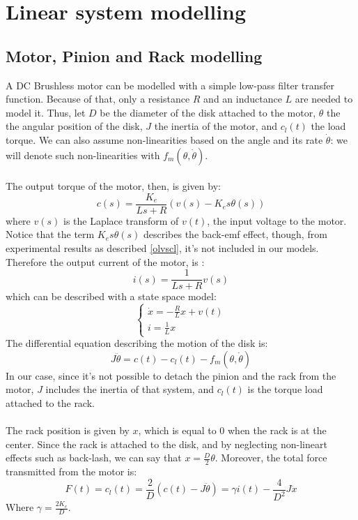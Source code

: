 
\chapter{Linear system modelling}
\section{Motor, Pinion and Rack modelling} 
A DC Brushless motor can be modelled with a simple low-pass filter transfer function. Because of that, only a resistance $R$ and an inductance $L$ are needed to model it. Thus, let $D$ be the diameter of the disk attached to the motor, $\theta$ the the angular position of the disk, $J$ the inertia of the motor, and $c_{l}(t)$ the load torque. We can also assume non-linearities based on the angle and its rate $\dot{\theta}$:  we will denote such non-linearities with $f_{m}(\theta,\dot{\theta})$.\\ \\
 The output torque of the motor, then, is  given by:
$$c(s) = \frac{K_{e}}{Ls+R} (v(s)-K_{e}s \theta(s))$$
where $v(s)$ is the Laplace transform of $v(t)$, the input voltage to the motor.\\Notice that the term $K_{e}s \theta(s)$ describes the back-emf effect, though, from experimental results as described \ref{olvscl}, it's not included in our models. Therefore the output current of the motor, is :
$$i(s) = \frac{1}{Ls+R} v(s)$$
which can be described with a state space model:
$$\begin{cases} \dot{x} =-\frac{R}{L}x + v(t)\\ i = \frac{1}{L}x\end{cases}$$
The differential equation describing the motion of the disk is:
$$J\ddot{\theta}=c(t)-c_{l}(t) -f_{m}(\theta,\dot{\theta})$$
In our case, since it's not possible to detach the pinion and the rack from the motor, $J$ includes the inertia of that system, and $c_{l}(t)$ is the torque load attached to the rack. 
\\ \\
The rack position is given by $x$, which is equal to $0$ when the rack is at the center. Since the rack is attached to the disk, and by neglecting non-lineart effects such as back-lash, we can say that $x=\frac{D}{2}\theta $. Moreover,  the total force transmitted from the motor is:
$$F(t) =c_l (t) =  \frac{2}{D} (c(t)-J\ddot{\theta}) = \gamma i(t) - \frac{4}{D^2}J \ddot{x}$$
Where $\gamma = \frac{2K_e}{D}$.


